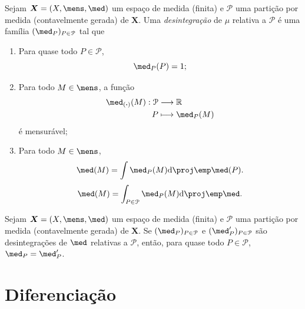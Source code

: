 \begin{defi}
Sejam $\bm X=(X,\mens,\med)$ um espaço de medida (finita) e $\mathcal P$ uma partição por medida (contavelmente gerada) de $\bm X$. Uma \emph{desintegração} de $\mu$ relativa a $\mathcal P$ é uma família $(\med_P)_{P \in \mathcal P}$ tal que
	\begin{enumerate}
	\item Para quase todo $P \in \mathcal P$,
		\begin{equation*}
		\med_P(P)=1;
		\end{equation*}
	
	\item Para todo $M \in \mens$, a função
		\begin{align*}
		\func{\med_{(\var)}(M)}{\mathcal P}{\R}{P}{\med_P(M)}
		\end{align*}
é mensurável;
	
	\item Para todo $M \in \mens$,
		\begin{equation*}
		\med(M) = \int \med_P(M) \dd\proj\emp\med(P).
		\end{equation*}
		\begin{equation*}
		\med(M) = \int_{P \in \mathcal P} \med_P(M) \dd\proj\emp\med.
		\end{equation*}
	\end{enumerate}
\end{defi}

\begin{prop}
Sejam $\bm X=(X,\mens,\med)$ um espaço de medida (finita) e $\mathcal P$ uma partição por medida (contavelmente gerada) de $\bm X$. Se $(\med_P)_{P \in \mathcal P}$ e $(\med'_P)_{P \in \mathcal P}$ são desintegrações de $\med$ relativas a $\mathcal P$, então, para quase todo $P \in \mathcal P$, $\med_P=\med'_P$.
\end{prop}















\chapter{Diferenciação}

